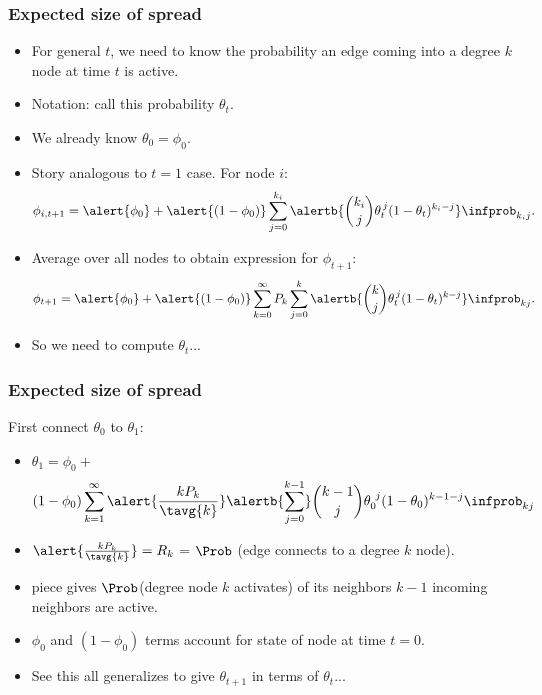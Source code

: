 \begin{frame}
  \frametitle{Expected size of spread}

  \begin{block}{}
  \begin{itemize}
  \item<1->
    For general $t$, we need to know
    the probability an edge coming into a degree $k$ node
    at time $t$ is active.
  \item<2->
    \alert{Notation:} call this probability $\theta_t$.
  \item<3->
    We already know $\theta_0 = \phi_0$.
  \item<4->
    Story analogous to $t=1$ case.  For node $i$:
    $$
    \phi_{i,t+1}
    = 
    \alert{\phi_{0}}
    + 
    \alert{(1-\phi_{0})}
    \sum_{j=0}^{k_i}
    \alertb{\binom{k_i}{j}
    \theta_t^{\, j}
    (1-\theta_t)^{k_i-j}}
    \infprob_{k_i j}.
    $$
  \item<5->
    Average over all nodes to obtain expression for $\phi_{t+1}$:
    $$
    \phi_{t+1}
    = 
    \alert{\phi_{0}}
    + 
    \alert{(1-\phi_{0})}
    \sum_{k=0}^{\infty} P_k 
    \sum_{j=0}^{k}
    \alertb{\binom{k}{j}
    \theta_t^{\, j}
    (1-\theta_t)^{k-j}}
    \infprob_{kj}.
    $$
  \item<6->
    So we need to compute $\theta_t$...  
  \end{itemize}
  \end{block}
  
\end{frame}

\begin{frame}
  \frametitle{Expected size of spread}
  
  \begin{block}{First connect $\theta_0$ to $\theta_1$:}
    \begin{itemize}
    \item<1->
      $
      \theta_{1}
      =
      \phi_0 +
      $
      $$
      (1-\phi_0)
      \sum_{k=1}^{\infty}
      \alert{\frac{k P_k}{\tavg{k}}}
      \alertb{\sum_{j=0}^{k-1}}
      \binom{k-1}{j}
      \theta_{0}^{\ j}
      (1-\theta_{0})^{k-1-j}
      \infprob_{kj}
      $$
    \item<1->
      $ \alert{\frac{kP_k}{\tavg{k}}} = R_k$ = $\Prob$ (edge connects to a degree $k$ node).
    \item<1->
       piece gives $\Prob$(degree node $k$ activates)
      of its neighbors $k-1$ incoming neighbors are active.
    \item<1->
      $\phi_0$ and $(1-\phi_0)$ terms account for state of node at time $t=0$.
    \item<2->
      See this all generalizes to give $\theta_{t+1}$ in terms of $\theta_{t}$...
    \end{itemize}
  \end{block}
\end{frame}

